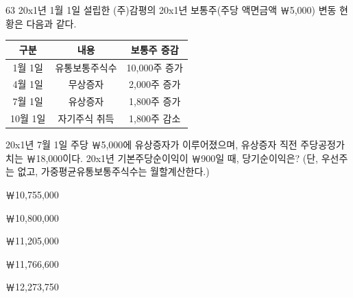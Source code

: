 \begin{question}{63}
20x1년 1월 1일 설립한 (주)감평의 20x1년 보통주(주당 액면금액 ￦5,000) 변동 현황은 다음과 같다.
\par{\small\centering\begin{tabular}{|c|c|c|}\hline
구분 & 내용 & 보통주 증감 \\ \hline
1월 1일 & 유통보통주식수 & 10,000주 증가 \\ \hline
4월 1일 & 무상증자 & 2,000주 증가 \\ \hline
7월 1일 & 유상증자 & 1,800주 증가 \\ \hline
10월 1일 & 자기주식 취득 & 1,800주 감소 \\ \hline
\end{tabular}\par}
20x1년 7월 1일 주당 ￦5,000에 유상증자가 이루어졌으며, 유상증자 직전 주당공정가치는 ￦18,000이다. 20x1년 기본주당순이익이 ￦900일 때, 당기순이익은? (단, 우선주는 없고, 가중평균유통보통주식수는 월할계산한다.)
\begin{choices}
  \item ￦10,755,000
  \item ￦10,800,000
  \item ￦11,205,000
  \item ￦11,766,600
  \item ￦12,273,750
\end{choices}
\end{question}
